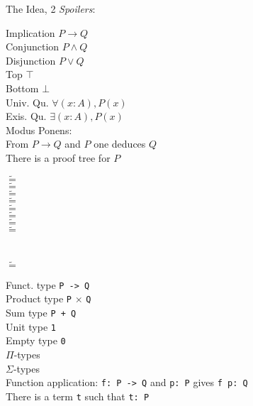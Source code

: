 \begin{frame}{The Idea, 2}
  \textit{Spoilers}:\\[1em]
  \begin{minipage}[t]{0.42\textwidth}
       Implication $P \rightarrow Q$\\
       Conjunction $P ∧ Q$\\
       Disjunction $P ∨ Q$\\
       Top $⊤$\\
       Bottom $⊥$\\[1em]
       Univ. Qu. $∀(x:A), P(x)$\\
       Exis. Qu. $∃(x:A), P(x)$\\[1em]
       Modus Ponens:\\From $P \rightarrow Q$ and $P$ one deduces $Q$\\[1em]
       There is a proof tree for $P$
  \end{minipage}
  \begin{minipage}[t]{0.04\textwidth}
       $\tilde{=}$\\
       $\tilde{=}$\\
       $\tilde{=}$\\
       $\tilde{=}$\\
       $\tilde{=}$\\[1em]
       $\tilde{=}$\\
       $\tilde{=}$\\[1em]
       $\tilde{=}$\\[1em]
       ~\\~\\
       $\tilde{=}$\\
  \end{minipage}
  \begin{minipage}[t]{0.35\textwidth}
       Funct. type \lstinline|P -> Q|\\
       Product type \lstinline[mathescape=true]|P| $\times$ \lstinline|Q|\\
       Sum type \lstinline|P + Q|\\
       Unit type \lstinline|1|\\
       Empty type \lstinline|0|\\[1em]
       $Π$-types\\
       $\Sigma$-types\\[1em]
       Function application: \lstinline|f: P -> Q| and \lstinline|p: P| gives \lstinline|f p: Q|\\[1em]
       There is a term \lstinline|t| such that \lstinline|t: P|
  \end{minipage}
\end{frame}

